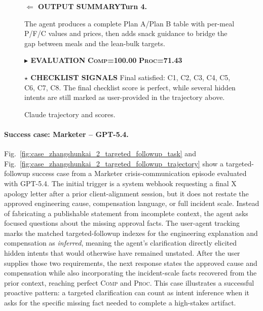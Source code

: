\documentclass{llmxive}
\providecommand{\inferred}{\colorbox{cyan!20}{\textit{inferred}}}
\providecommand{\caseZhangshunkaiOneTag}[3]{    {\setlength{\fboxsep}{1.6pt}\colorbox{#1}{\scriptsize\textbf{#3}}}}
\providecommand{\caseZhangshunkaiOneLine}[3]{    \caseZhangshunkaiOneTag{#1}{#2}{#3}\hspace{3pt}}
\providecommand{\caseZhangshunkaiOneIO}[3]{    \vspace{2pt}
    \noindent\caseZhangshunkaiOneLine{#1}{white}{#2}\textbf{#3}
}
\begin{document}
\begin{figure}[!htbp]
{    \caseZhangshunkaiOneIO{green!45!black}{$\Leftarrow$ OUTPUT SUMMARY}{Turn 4.}
    The agent produces a complete Plan A/Plan B table with per-meal P/F/C values and prices, then adds snack guidance to bridge the gap between meals and the lean-bulk targets.

    \vspace{5pt}
    \caseZhangshunkaiOneLine{purple!70!black}{white}{$\blacktriangleright$ EVALUATION}
    \caseZhangshunkaiOneTag{orange!15}{orange!80!black}{\textsc{Comp}=100.00}
    \hspace{3pt}
    \caseZhangshunkaiOneTag{cyan!15}{cyan!45!black}{\textsc{Proc}=71.43}

    \vspace{3pt}
    \noindent\caseZhangshunkaiOneLine{orange!80!black}{white}{$\star$ CHECKLIST SIGNALS}
    Final satisfied: C1, C2, C3, C4, C5, C6, C7, C8.
    The final checklist score is perfect, while several hidden intents are still marked as user-provided in the trajectory above.
    }
    \caption{Claude trajectory and scores.}
    \label{fig:case_zhangshunkai_1_claude_trajectory}
\end{figure}


\paragraph{Success case: Marketer -- GPT-5.4.}
Fig.~\ref{fig:case_zhangshunkai_2_targeted_followup_task} and Fig.~\ref{fig:case_zhangshunkai_2_targeted_followup_trajectory} show a targeted-followup success case from a Marketer crisis-communication episode evaluated with GPT-5.4.
The initial trigger is a system webhook requesting a final X apology letter after a prior client-alignment session, but it does not restate the approved engineering cause, compensation language, or full incident scale.
Instead of fabricating a publishable statement from incomplete context, the agent asks focused questions about the missing approval facts.
The user-agent tracking marks the matched targeted-followup indexes for the engineering explanation and compensation as {\inferred}, meaning the agent's clarification directly elicited hidden intents that would otherwise have remained unstated.
After the user supplies those two requirements, the next response states the approved cause and compensation while also incorporating the incident-scale facts recovered from the prior context, reaching perfect \textsc{Comp} and \textsc{Proc}.
This case illustrates a successful proactive pattern: a targeted clarification can count as intent inference when it asks for the specific missing fact needed to complete a high-stakes artifact.
\end{document}
